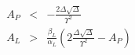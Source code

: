 \begin{eqnarray}
  A_{P} &<& -\frac{2\Delta\sqrt\Delta}{\varUpsilon^{2}}\\
  A_{L} &>& \frac{\beta_{L}}{\alpha_{L}}\left(2\frac{\Delta\sqrt\Delta}{\varUpsilon^{2}} - A_{P}\right)
\end{eqnarray}
